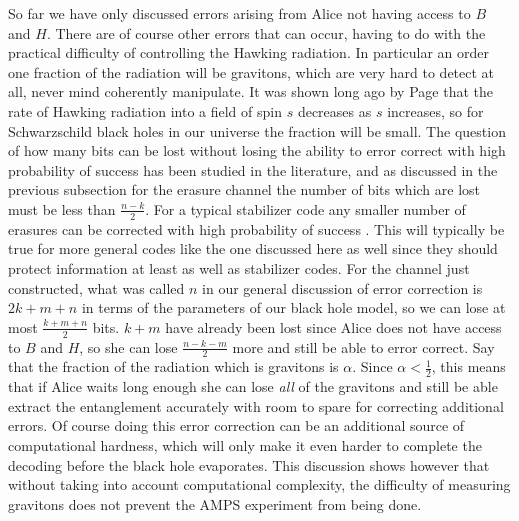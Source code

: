 \documentclass[12pt]{article}
\newcommand{\be}{\begin{equation}}
\newcommand{\ee}{\end{equation}}
\newcommand{\HH}{\mathcal{H}_H}
\newcommand{\HR}{\mathcal{H}_R}
\newcommand{\lan}{\langle}
\newcommand{\ran}{\rangle}
\newcommand{\Tr}{\mathrm{Tr}}
\begin{document}
So far we have only discussed errors arising from Alice not having access to $B$ and $H$.  There are of course other errors that can occur, having to do with the practical difficulty of controlling the Hawking radiation.  In particular an order one fraction of the radiation will be gravitons, which are very hard to detect at all, never mind coherently manipulate.  It was shown long ago by Page \cite{pageevap} that the rate of Hawking radiation into a field of spin $s$ decreases as $s$ increases, so for Schwarzschild black holes in our universe the fraction will be small. The question of how many bits can be lost without losing the ability to error correct with high probability of success has been studied in the literature, and as discussed in the previous subsection for the erasure channel the number of bits which are lost must be less than $\frac{n-k}{2}$. For a typical stabilizer code any smaller number of erasures can be corrected with high probability of success \cite{preskillnotes}.  This will typically be true for more general codes like the one discussed here as well since they should protect information at least as well as stabilizer codes.  For the channel just constructed, what was called $n$ in our general discussion of error correction is $2k+m+n$ in terms of the parameters of our black hole model, so we can lose at most $\frac{k+m+n}{2}$ bits.  $k+m$ have already been lost since Alice does not have access to $B$ and $H$, so she can lose $\frac{n-k-m}{2}$ more and still be able to error correct.  Say that the fraction of the radiation which is gravitons is $\alpha$.  Since $\alpha<\frac{1}{2}$, this means that if Alice waits long enough she can lose \textit{all} of the gravitons and still be able extract the entanglement accurately with room to spare for correcting additional errors.  Of course doing this error correction can be an additional source of computational hardness, which will only make it even harder to complete the decoding before the black hole evaporates.  This discussion shows however that without taking into account computational complexity, the difficulty of measuring gravitons does not prevent the AMPS experiment from being done.

\end{document}
